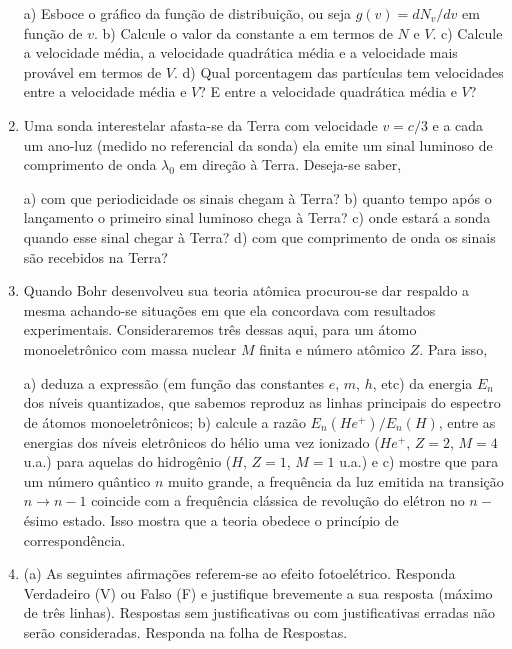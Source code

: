 \begin{enumerate}[start=1,label={\bfseries Q\arabic*.}]
a) Esboce o gráfico da função de distribuição, ou seja $g(v) = d N_{v}/dv$ em função de $v$.
b) Calcule o valor da constante a em termos de $N$ e $V$.
c) Calcule a velocidade média, a velocidade quadrática média e a velocidade mais provável em termos de $V$.
d) Qual porcentagem das partículas tem velocidades entre a velocidade média e $V$? E entre a velocidade quadrática média e $V$?




\item Uma sonda interestelar afasta-se da Terra com velocidade $v = c/3$ e a cada um ano-luz (medido no referencial da sonda) ela emite um sinal luminoso de comprimento de onda $\lambda_{0}$ em direção à Terra. Deseja-se saber,

a) com que periodicidade os sinais chegam à Terra?
b) quanto tempo após o lançamento o primeiro sinal luminoso chega à Terra?
c) onde estará a sonda quando esse sinal chegar à Terra?
d) com que comprimento de onda os sinais são recebidos na Terra?




\item Quando Bohr desenvolveu sua teoria atômica procurou-se dar respaldo a mesma achando-se situações em que ela concordava com resultados experimentais. Consideraremos três dessas aqui, para um átomo monoeletrônico com massa nuclear $M$ finita e número atômico $Z$. Para isso,

a) deduza a expressão (em função das constantes $e$, $m$, $h$, etc) da energia $E_{n}$ dos níveis quantizados, que sabemos reproduz as linhas principais do espectro de átomos monoeletrônicos;
b) calcule a razão $E_{n}(He^{+})/E_{n}(H)$, entre as energias dos níveis eletrônicos do hélio uma vez ionizado ($He^{+}$, $Z=2$, $M=4$ u.a.) para aquelas do hidrogênio ($H$, $Z=1$, $M=1$ u.a.) e
c) mostre que para um número quântico $n$ muito grande, a frequência da luz emitida na transição $n \rightarrow n - 1$  coincide com a frequência clássica de revolução do elétron no $n-$ésimo estado. Isso mostra que a teoria obedece o princípio de correspondência.





\item (a) As seguintes afirmações referem-se ao efeito fotoelétrico. Responda Verdadeiro (V) ou Falso (F) e justifique brevemente a sua resposta (máximo de três linhas). Respostas sem justificativas ou com justificativas erradas não serão consideradas. Responda na folha de Respostas.


\end{enumerate}
